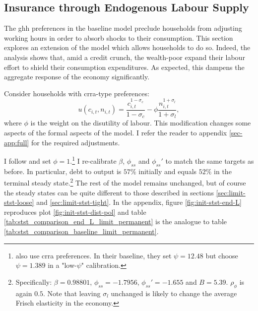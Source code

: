 \documentclass[a4paper,12pt]{article} %
\numberwithin{equation}{section} %
\numberwithin{figure}{section}
\numberwithin{table}{section}
\begin{document}
\subsection{Insurance through Endogenous Labour Supply}
\label{sec:sensitivity-end-labour}

The \Gls{ghh} preferences in the baseline model preclude households from adjusting working hours in order to absorb shocks to their consumption. This section explores an extension of the model which allows households to do so. Indeed, the analysis shows that, amid a credit crunch, the wealth-poor expand their labour effort to shield their consumption expenditures. As expected, this dampens the aggregate response of the economy significantly.

Consider households with \Gls{crra}-type preferences:
\begin{equation}
    u(c_{i,t}, n_{i,t}) = \frac{c_{i,t}^{1-\sigma_c}}{1-\sigma_c} - \phi \frac{n_{i,t}^{1+\sigma_l}}{1+\sigma_l}, \label{eq:hh-crra-utility}
\end{equation}
where $\phi$ is the weight on the disutility of labour. This modification changes some aspects of the formal aspects of the model. I refer the reader to appendix \ref{sec-app:full} for the required adjustments.

I follow \textcite{mckay2016} and set $\phi=1$.\footnote{\textcite{gl2017} also use \Gls{crra} preferences. In their baseline, they set $\psi = 12.48$ but choose $\psi = 1.389$ in a "low-$\psi$" calibration.} I re-calibrate $\beta$, $\phi_{ss}$ and $\phi_{ss}'$ to match the same targets as before. In particular, debt to output is $57\%$ initially and equals $52\%$ in the terminal steady state.\footnote{Specifically: $\beta = 0.98801$, $\phi_{ss} = -1.7956$, $\phi_{ss}' = -1.655$ and $B = 5.39$. $\rho_{\phi}$ is again $0.5$. Note that leaving $\sigma_l$ unchanged is likely to change the average Frisch elasticity in the economy.} The rest of the model remains unchanged, but of course the steady states can be quite different to those described in sections \ref{sec:limit-stst-loose} and \ref{sec:limit-stst-tight}. In the appendix, figure \ref{fig:init-stst-end-L} reproduces plot \ref{fig:init-stst-dist-pol} and table \ref{tab:stst_comparison_end_L_limit_permanent} is the analogue to table \ref{tab:stst_comparison_baseline_limit_permanent}.
\end{document}
